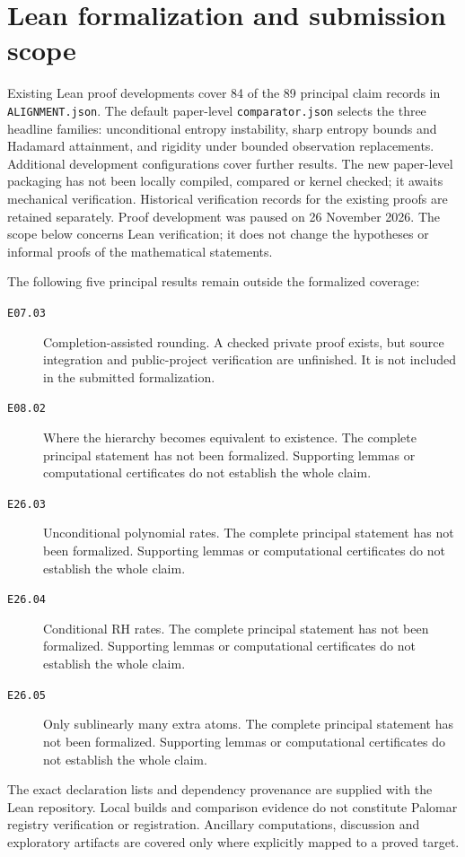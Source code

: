 \section*{Lean formalization and submission scope}
Existing Lean proof developments cover 84 of the 89 principal claim records in \texttt{ALIGNMENT.json}. The default paper-level \texttt{comparator.json} selects the three headline families: unconditional entropy instability, sharp entropy bounds and Hadamard attainment, and rigidity under bounded observation replacements. Additional development configurations cover further results. The new paper-level packaging has not been locally compiled, compared or kernel checked; it awaits mechanical verification. Historical verification records for the existing proofs are retained separately. Proof development was paused on 26 November 2026. The scope below concerns Lean verification; it does not change the hypotheses or informal proofs of the mathematical statements.

The following five principal results remain outside the formalized coverage:
\begin{description}
\item[\texttt{E07.03}] Completion-assisted rounding. A checked private proof exists, but source integration and public-project verification are unfinished. It is not included in the submitted formalization.
\item[\texttt{E08.02}] Where the hierarchy becomes equivalent to existence. The complete principal statement has not been formalized. Supporting lemmas or computational certificates do not establish the whole claim.
\item[\texttt{E26.03}] Unconditional polynomial rates. The complete principal statement has not been formalized. Supporting lemmas or computational certificates do not establish the whole claim.
\item[\texttt{E26.04}] Conditional RH rates. The complete principal statement has not been formalized. Supporting lemmas or computational certificates do not establish the whole claim.
\item[\texttt{E26.05}] Only sublinearly many extra atoms. The complete principal statement has not been formalized. Supporting lemmas or computational certificates do not establish the whole claim.
\end{description}

The exact declaration lists and dependency provenance are supplied with the Lean repository. Local builds and comparison evidence do not constitute Palomar registry verification or registration. Ancillary computations, discussion and exploratory artifacts are covered only where explicitly mapped to a proved target.
